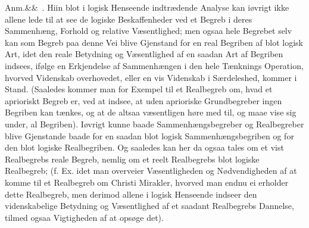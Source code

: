 \documentclass[12pt]{book}
\def\sperr#1{#1}%
\def\textit#1{#1}%
\def\emph#1{#1}%
\newcommand{\sperr}[1]{\textls[180]{#1}}
\newcommand{\anm}[1]{%
  \par\vspace{0.5\baselineskip}%
  \noindent\hspace{\parindent}\sperr{Anm.}\ifx&#1&\else~\textit{#1}.\fi
  \enspace\ignorespaces
}
\newcommand{\opage}[1]{\marginnote{\footnotesize\textit{[#1]}}}
\begin{document}
\anm{} Hiin blot i logisk Henseende indtrædende Analyse kan iøvrigt ikke allene lede til
at see de logiske Beskaffenheder ved et Begreb i deres Sammenhæng, Forhold og relative
Væsentlighed; men ogsaa hele Begrebet selv kan som Begreb paa denne Vei blive Gjenstand
for en \emph{real} Begriben af blot logisk Art, idet den \emph{reale} Betydning og
Væsentlighed af en saadan Art af Begriben indsees, ifølge en Erkjendelse af Sammenhængen
i den hele Tænknings Operation, hvorved Videnskab overhovedet, eller en vis Videnskab i
Særdeleshed, kommer i Stand. (Saaledes kommer man for Exempel til et Realbegreb om,
hvad et aprioriskt Begreb er, ved at indsee, at uden aprioriske Grundbegreber ingen
Begriben kan tænkes, og at de altsaa væsentligen høre med til, og maae vise sig under,
al Begriben). Iøvrigt kunne baade \emph{Sammenhængsbegreber} og \emph{Realbegreber}
blive Gjenstande baade for en saadan blot logisk Sammenhængsbegriben og for den blot
logiske Realbegriben. Og saaledes kan her da ogsaa tales om et vist Realbegrebs reale
Begreb, nemlig om et reelt
\opage{226} Realbegrebs blot logiske Realbegreb; (f. Ex. idet man overveier Væsentligheden og
Nødvendigheden af at komme til et Realbegreb om Christi Mirakler, hvorved man endnu ei
erholder dette Realbegreb, men derimod allene i logisk Henseende indseer den
videnskabelige Betydning og Væsentlighed af et saadant Realbegrebs Dannelse, tilmed
ogsaa Vigtigheden af at opsøge det).
\end{document}
